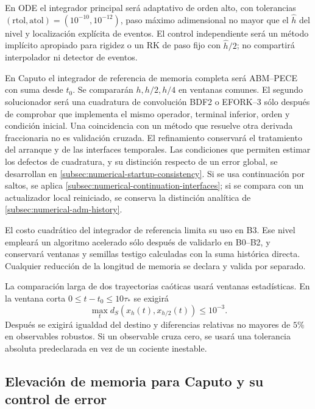 En ODE el integrador principal será adaptativo de orden alto, con tolerancias
\((\mathrm{rtol},\mathrm{atol})=(10^{-10},10^{-12})\), paso máximo adimensional
no mayor que el \(\widehat h\) del nivel y localización explícita de eventos. El control
independiente será un método implícito apropiado para rigidez o un RK de paso
fijo con \(\widehat h/2\); no compartirá interpolador ni detector de eventos.

En Caputo el integrador de referencia de memoria completa será ABM--PECE con suma desde \(t_0\).
Se compararán \(h,h/2,h/4\) en ventanas comunes. El segundo solucionador será
una cuadratura de convolución BDF2 o EFORK--3 sólo después de comprobar que
implementa el mismo operador, terminal inferior, orden y condición inicial.
Una coincidencia con un método que resuelve otra derivada fraccionaria no es
validación cruzada.
El refinamiento conservará el tratamiento del arranque y de las interfaces
temporales. Las condiciones que permiten estimar los defectos de cuadratura,
y su distinción respecto de un error global, se desarrollan en
\cref{subsec:numerical-startup-consistency}. Si se usa continuación por
saltos, se aplica \cref{subsec:numerical-continuation-interfaces}; si se
compara con un actualizador local reiniciado, se conserva la distinción
analítica de \cref{subsec:numerical-adm-history}.

El costo cuadrático del integrador de referencia limita su uso en B3.
Ese nivel empleará un algoritmo acelerado sólo después de validarlo en B0--B2,
y conservará ventanas y semillas testigo calculadas con la suma histórica
directa. Cualquier reducción de la longitud de memoria se declara y valida por
separado.

La comparación larga de dos trayectorias caóticas usará ventanas estadísticas.
En la ventana corta \(0\leq t-t_0\leq10\tau_*\) se exigirá
\begin{equation}
 \max_t d_S(x_h(t),x_{h/2}(t))\leq10^{-3}.
 \label{camp:eq-short-error}
\end{equation}
Después se exigirá igualdad del destino y diferencias relativas no mayores de
\(5\%\) en observables robustos. Si un observable cruza cero, se usará una
tolerancia absoluta predeclarada en vez de un cociente inestable.

\subsection{Elevación de memoria para Caputo y su control de error}
\label{camp:caputo-lift}

